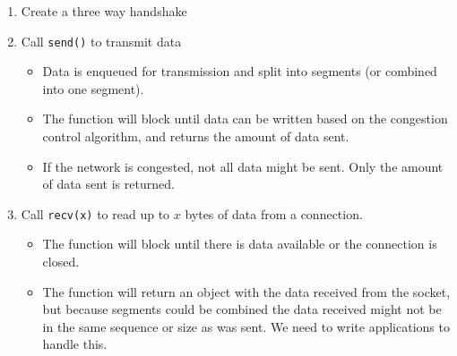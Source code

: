 \begin{enumerate}
    \item Create a three way handshake
    \item Call \texttt{send()} to transmit data
          \begin{itemize}
              \item Data is enqueued for transmission and split into segments (or combined into one segment).
              \item The function will block until data can be written based on the congestion control algorithm, and returns the amount of data sent.
              \item If the network is congested, not all data might be sent.
                    Only the amount of data sent is returned.
          \end{itemize}
    \item Call \texttt{recv(x)} to read up to \(x\) bytes of data from a connection.
          \begin{itemize}
              \item The function will block until there is data available or the connection is closed.
              \item The function will return an object with the data received from the socket, but because segments could be combined the data received might not be in the same sequence or size as was sent.
                    We need to write applications to handle this.
          \end{itemize}
\end{enumerate}
